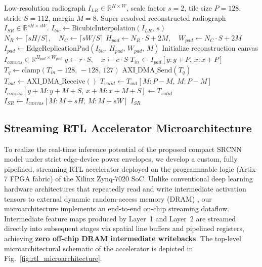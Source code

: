 \documentclass[conference]{IEEEtran}
\begin{document}
\begin{algorithm}[t]
\caption{Hardware-Aware Overlap-Tiling and DMA Streaming}
\label{alg:tiling_dma}
\begin{algorithmic}[1]
\Require Low-resolution radiograph $I_{LR} \in \mathbb{R}^{H \times W}$, scale factor $s = 2$, tile size $P = 128$, stride $S = 112$, margin $M = 8$.
\Ensure Super-resolved reconstructed radiograph $I_{SR} \in \mathbb{R}^{sH \times sW}$.
\State $I_{bic} \leftarrow \text{BicubicInterpolation}(I_{LR},\, s)$ 
\State $N_R \leftarrow \lceil sH / S \rceil, \quad N_C \leftarrow \lceil sW / S \rceil$ 
\State $H_{pad} \leftarrow N_R \cdot S + 2M, \quad W_{pad} \leftarrow N_C \cdot S + 2M$
\State $I_{pad} \leftarrow \text{EdgeReplicationPad}(I_{bic},\, H_{pad},\, W_{pad},\, M)$
\State Initialize reconstruction canvas $I_{canvas} \in \mathbb{R}^{H_{pad} \times W_{pad}}$
        \State $y \leftarrow r \cdot S, \quad x \leftarrow c \cdot S$
        \State $T_{in} \leftarrow I_{pad}[y : y + P,\, x : x + P]$ 
        \State $T_q \leftarrow \text{clamp}(T_{in} - 128,\, -128,\, 127)$ 
        \State $\text{AXI\_DMA\_Send}(T_q)$ 
        \State $T_{out} \leftarrow \text{AXI\_DMA\_Receive}()$ 
        \State $T_{valid} \leftarrow T_{out}[M : P - M,\, M : P - M]$ 
        \State $I_{canvas}[y + M : y + M + S,\, x + M : x + M + S] \leftarrow T_{valid}$
    \EndFor
\EndFor
\State $I_{SR} \leftarrow I_{canvas}[M : M + sH,\, M : M + sW]$ 
\State \Return $I_{SR}$
\end{algorithmic}
\end{algorithm}

\subsection{Streaming RTL Accelerator Microarchitecture}
\label{sec:rtl_arch}

To realize the real-time inference potential of the proposed compact SRCNN model under strict edge-device power envelopes, we develop a custom, fully pipelined, streaming RTL accelerator deployed on the programmable logic (Artix-7 FPGA fabric) of the Xilinx Zynq-7020 SoC. Unlike conventional deep learning hardware architectures that repeatedly read and write intermediate activation tensors to external dynamic random-access memory (DRAM) \cite{sze2017efficient}, our microarchitecture implements an end-to-end on-chip streaming dataflow. Intermediate feature maps produced by Layer~1 and Layer~2 are streamed directly into subsequent stages via spatial line buffers and pipelined registers, achieving \textbf{zero off-chip DRAM intermediate writebacks}. The top-level microarchitectural schematic of the accelerator is depicted in Fig.~\ref{fig:rtl_microarchitecture}.
\end{document}
